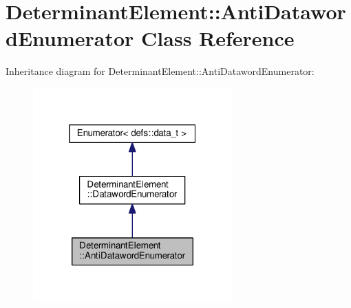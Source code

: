 \hypertarget{classDeterminantElement_1_1AntiDatawordEnumerator}{}\section{Determinant\+Element\+:\+:Anti\+Dataword\+Enumerator Class Reference}
\label{classDeterminantElement_1_1AntiDatawordEnumerator}


Inheritance diagram for Determinant\+Element\+:\+:Anti\+Dataword\+Enumerator\+:
\nopagebreak
\begin{figure}[H]
\begin{center}
\leavevmode
\includegraphics[width=217pt]{classDeterminantElement_1_1AntiDatawordEnumerator__inherit__graph}
\end{center}
\end{figure}


